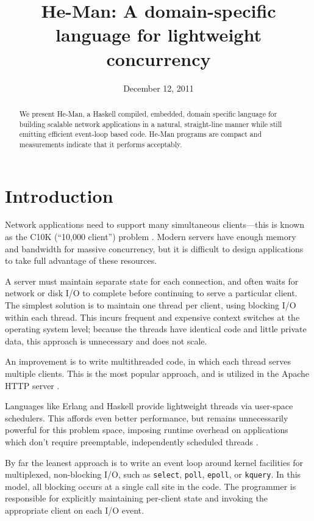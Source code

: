 \documentclass[preprint,11pt]{sigplanconf}
\title{He-Man: A domain-specific language for lightweight concurrency}
\date{December 12, 2011}
\renewcommand{\t}{\texttt}
\begin{document}
\maketitle

\begin{abstract}
We present He-Man, a Haskell compiled, embedded, domain specific
language for building scalable network applications in a natural,
straight-line manner while still emitting efficient event-loop based
code. He-Man programs are compact and measurements indicate that it
performs acceptably. 
\end{abstract}

\section{Introduction}

Network applications need to support many simultaneous clients---this is known
as the C10K (``10,000 client'') problem \cite{Kegel}. Modern servers have enough
memory and bandwidth for massive concurrency, but it is difficult to design
applications to take full advantage of these resources.

A server must maintain separate state for each connection, and often waits for
network or disk I/O to complete before continuing to serve a particular client.
The simplest solution is to maintain one thread per client, using blocking I/O
within each thread. This incurs frequent and expensive context switches at the
operating system level; because the threads have identical code and little
private data, this approach is unnecessary and does not scale.

An improvement is to write multithreaded code, in which each thread serves
multiple clients. This is the most popular approach, and is utilized in the
Apache HTTP server \cite{Apache}.

Languages like Erlang and Haskell provide lightweight threads via user-space
schedulers. This affords even better performance, but remains unnecessarily
powerful for this problem space, imposing runtime overhead on applications which
don't require preemptable, independently scheduled threads \cite{Vinoski}.

By far the leanest approach is to write an event loop around kernel facilities
for multiplexed, non-blocking I/O, such as \t{select}, \t{poll}, \t{epoll}, or
\t{kquery}. In this model, all blocking occurs at a single call site in the
code. The programmer is responsible for explicitly maintaining per-client state
and invoking the appropriate client on each I/O event.
\end{document}
